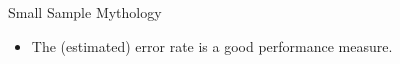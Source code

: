 \documentclass{beamer}
\begin{document}
\begin{frame}{Small Sample Mythology}
  \begin{itemize}
  \item The (estimated) error rate is a good performance measure.


\end{itemize}
\end{frame}
\end{document}
